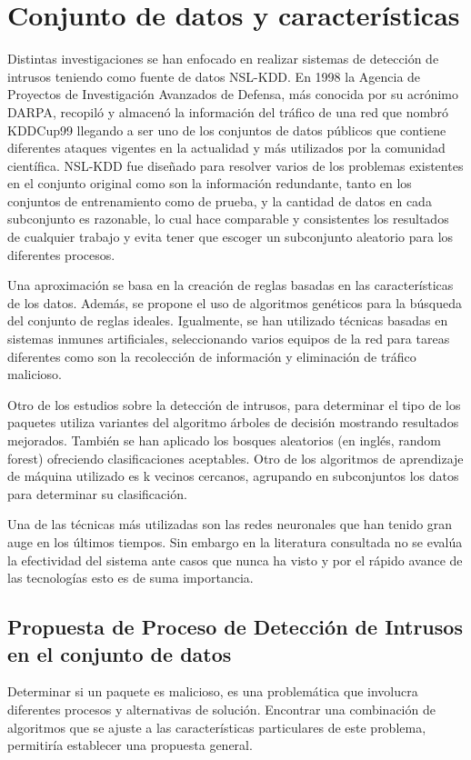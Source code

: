 \section{Conjunto de datos y características}
Distintas investigaciones se han enfocado en realizar sistemas de detección de intrusos teniendo como fuente de datos NSL-KDD. En 1998 la Agencia de Proyectos de Investigación Avanzados de Defensa, más conocida por su acrónimo DARPA, recopiló y almacenó la información del tráfico de una red que nombró KDDCup99 llegando a ser uno de los conjuntos de datos públicos que contiene diferentes ataques vigentes en la actualidad y más utilizados por la comunidad científica. NSL-KDD fue diseñado para resolver varios de los problemas existentes en el conjunto original como son la información redundante, tanto en los conjuntos de entrenamiento como de prueba, y la cantidad de datos en cada subconjunto es razonable, lo cual hace comparable y consistentes los resultados de cualquier trabajo y evita tener que escoger un subconjunto aleatorio para los diferentes procesos.

Una aproximación se basa en la creación de reglas basadas en las características de los datos. Además, se propone el uso de algoritmos genéticos para la búsqueda del conjunto de reglas ideales. Igualmente, se han utilizado técnicas basadas en sistemas inmunes artificiales, seleccionando varios equipos de la red para tareas diferentes como son la recolección de información y eliminación de tráfico malicioso.

Otro de los estudios sobre la detección de intrusos, para determinar el tipo de los paquetes utiliza variantes del algoritmo árboles de decisión mostrando resultados mejorados. También se han aplicado los bosques aleatorios (en inglés, random forest) ofreciendo clasificaciones aceptables. Otro de los algoritmos de aprendizaje de máquina utilizado es k vecinos cercanos, agrupando en subconjuntos los datos para determinar su clasificación.

Una de las técnicas más utilizadas son las redes neuronales que han tenido gran auge en los últimos tiempos. Sin embargo en la literatura consultada no se evalúa la efectividad del sistema ante casos que nunca ha visto y por el rápido avance de las tecnologías esto es de suma importancia.

\subsection{Propuesta de Proceso de Detección de Intrusos en el conjunto de datos}
Determinar si un paquete es malicioso, es una problemática que involucra diferentes procesos y alternativas de solución. Encontrar una combinación de algoritmos que se ajuste a las características particulares de este problema, permitiría establecer una propuesta general.

